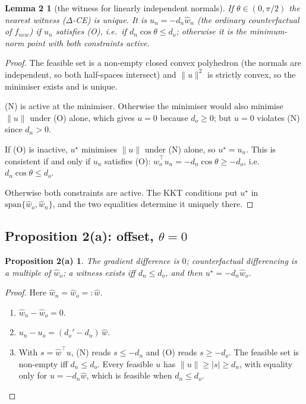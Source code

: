 \documentclass[10pt,a4paper]{article}
\newtheorem*{lemmatwo}{Lemma 2}
\newtheorem*{propa}{Proposition 2(a)}
\theoremstyle{remark}
\newcommand{\hw}{\hat w}
\newcommand{\norm}[1]{\lVert #1\rVert}
\newcommand{\DCE}{$\Delta$-CE}
\begin{document}
\begin{lemmatwo}[the witness for linearly independent normals]
If $\theta\in(0,\pi/2)$ the nearest witness (\DCE) is unique. It is $u_n=-d_n\hw_n$ (the ordinary counterfactual of $f_{new}$) if $u_n$ satisfies (O), i.e.\ if $d_n\cos\theta\le d_o$; otherwise it is the minimum-norm point with both constraints active.
\end{lemmatwo}
\begin{proof}
The feasible set is a non-empty closed convex polyhedron (the normals are independent, so both half-spaces intersect) and $\norm u^2$ is strictly convex, so the minimiser exists and is unique.

(N) is active at the minimiser. Otherwise the minimiser would also minimise $\norm u$ under (O) alone, which gives $u=0$ because $d_o\ge0$; but $u=0$ violates (N) since $d_n>0$.

If (O) is inactive, $u^\star$ minimises $\norm u$ under (N) alone, so $u^\star=u_n$. This is consistent if and only if $u_n$ satisfies (O): $\hw_o^\top u_n=-d_n\cos\theta\ge-d_o$, i.e.\ $d_n\cos\theta\le d_o$.

Otherwise both constraints are active. The KKT conditions put $u^\star$ in $\mathrm{span}\{\hw_o,\hw_n\}$, and the two equalities determine it uniquely there.
\end{proof}

\subsection{Proposition 2(a): offset, $\theta=0$}

\begin{propa}
The gradient difference is $0$; counterfactual differencing is a multiple of $\hw_o$; a witness exists iff $d_n\le d_o$, and then $u^\star=-d_n\hw_o$.
\end{propa}
\begin{proof}
Here $\hw_n=\hw_o=:\hw$.
\begin{enumerate}
\item $\hw_n-\hw_o=0$.
\item $u_n-u_o=(d_o'-d_n)\,\hw$.
\item With $s=\hw^\top u$, (N) reads $s\le-d_n$ and (O) reads $s\ge-d_o$. The feasible set is non-empty iff $d_n\le d_o$. Every feasible $u$ has $\norm u\ge|s|\ge d_n$, with equality only for $u=-d_n\hw$, which is feasible when $d_n\le d_o$.\qedhere
\end{enumerate}
\end{proof}
\end{document}
